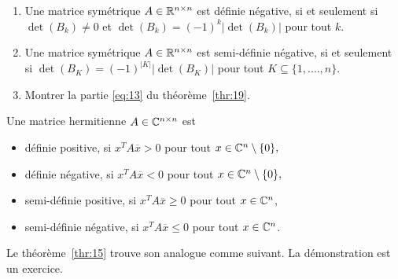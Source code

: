 \begin{enumerate}
\emph{Indication pour montrer $⟸$:  Il existe une matrice de permutation $Q$ telle que l'algorithme~\ref{alg:1} n'échange pas de colonnes et lignes si confronté avec  $Q^T \cdot A \cdot Q$ comme input et toutes itérations sont telles que $b_{ii} \neq 0$ jusqu'à  un point, où tout le reste de la matrice est $0$. Il faut s'appuyer sur les exercices \ref{item:17} et \ref{item:16}.}

\item Une matrice symétrique $A \in \mathbb{R}^{n \times n}$ est définie négative, si et seulement si $\det(B_k) \neq 0$ et $\det(B_k) = (-1)^k|\det(B_k)|$ pour tout $k$. 
\item Une matrice symétrique $A \in \mathbb{R}^{n \times n}$ est semi-définie négative, si et seulement si $\det(B_K) = (-1)^{|K|}|\det(B_K)|$ pour tout $K\subseteq \{1,.\dots,n\}$.  
\item Montrer la partie \eqref{eq:13} du théorème~\ref{thr:19}. 
 
\end{enumerate}








\begin{definition}
  \label{def:22}
  Une matrice hermitienne $A \in \mathbb{C}^{n \times n}$ est 
  \begin{itemize}
  \item définie positive, si $x^TA\overline{x}>0$ pour tout $x \in \mathbb{C}^n \setminus  \{0\},$ 
  \item définie négative, si $x^TA\overline{x}<0$ pour tout $x \in \mathbb{C}^n \setminus  \{0\},$ 
  \item semi-définie positive, si $x^TA\overline{x}\geq 0$ pour tout $x \in \mathbb{C}^n$,
  \item semi-définie négative, si $x^TA\overline{x}\leq 0$ pour tout $x \in \mathbb{C}^n$.  
  \end{itemize}
\end{definition}


Le théorème~\ref{thr:15} trouve son analogue comme suivant. La démonstration est un exercice. 


